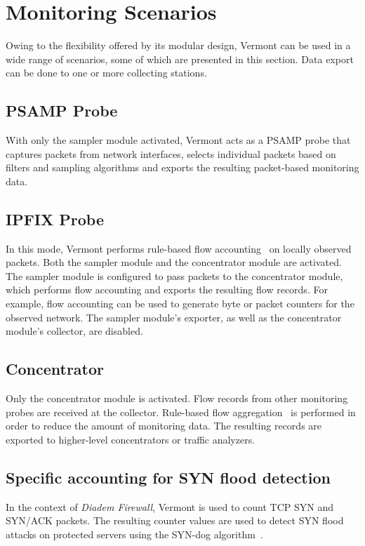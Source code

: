 \section{Monitoring Scenarios}
\label{sec:scenarios}

Owing to the flexibility offered by its modular design, Vermont can be used in a wide range of scenarios, some of which are presented in this section. Data export can be done to one or more collecting stations.

\subsection{PSAMP Probe}
With only the sampler module activated, Vermont acts as a PSAMP probe that captures packets from network interfaces, selects individual packets based on filters and sampling algorithms and exports the resulting packet-based monitoring data.

\subsection{IPFIX Probe}
In this mode, Vermont performs rule-based flow accounting~\cite{dressler-ipfix-aggregation} on locally observed packets. Both the sampler module and the concentrator module are activated.
The sampler module is configured to pass packets to the concentrator module, which performs flow accounting and exports the resulting flow records. For example, flow accounting can be used to generate byte or packet counters for the observed network.
The sampler module's exporter, as well as the concentrator module's collector, are disabled.

\subsection{Concentrator}
Only the concentrator module is activated. Flow records from other monitoring probes are received at the collector. Rule-based flow aggregation~\cite{dressler-ipfix-aggregation} is performed in order to reduce the amount of monitoring data.
The resulting records are exported to higher-level concentrators or traffic analyzers.

\subsection{Specific accounting for SYN flood detection}
In the context of \emph{Diadem Firewall}, Vermont is used to count TCP SYN and SYN/ACK packets. The resulting counter values are used to detect SYN flood attacks on protected servers using the SYN-dog algorithm~\cite{wang02syndog}.

